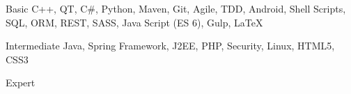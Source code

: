 

\begin{cvskills}

  \cvskill
    {Basic} %
    {C++, QT, C\#, Python, Maven, Git, Agile, TDD, Android, Shell Scripts, SQL, ORM, REST, SASS, Java Script (ES 6), Gulp, LaTeX} %

  \cvskill
    {Intermediate} %
    {Java, Spring Framework, J2EE, PHP, Security, Linux, HTML5, CSS3} %

  \cvskill
    {Expert} %
    {} %

\end{cvskills}
